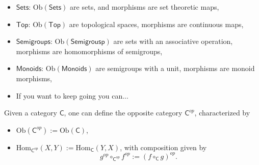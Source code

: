 \begin{ex}\leavevmode\vspace{-.2\baselineskip}
	\begin{itemize}
		\item $\mathsf{Sets}$: $\mathrm{Ob} \left(\mathsf{Sets}\right)$ are sets, and morphisms are set theoretic maps,
		\item $\mathsf{Top}$: $\mathrm{Ob} \left(\mathsf{Top}\right)$ are topological spaces, morphisms are continuous maps,
		\item $\mathsf{Semigroups}$: $\mathrm{Ob} \left(\mathsf{Semigrousp}\right)$ are sets with an associative operation, morphisms are homomorphisms of semigroups,
		\item $\mathsf{Monoids}$: $\mathrm{Ob} \left(\mathsf{Monoids}\right)$ are semigroups with a unit, morphisms are monoid morphisms,
		\item If you want to keep going you can...
	\end{itemize}
\end{ex} 

\begin{defn}
	Given a category $\mathsf{C}$, one can define the opposite category $\mathsf{C}^{op}$, characterized by
	\begin{itemize}
		\item $\mathrm{Ob}(\mathsf{C}^{op}) := \mathrm{Ob}(\mathsf{C})$,
		\item $\mathrm{Hom}_{\mathsf{C}^{op}} \left( X, Y \right) := \mathrm{Hom}_{\mathsf{C}} \left( Y, X \right)$, with composition given by
			\begin{equation}
				g^{op} \circ_{\mathsf{C}^{op}} f^{op} := \left( f \circ_{\mathsf{C}} g \right)^{op}
			.\end{equation} 
	\end{itemize} 
\end{defn}

